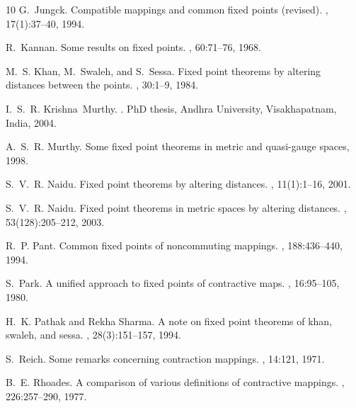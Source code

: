 \documentclass[11]{article}
\numberwithin{equation}{section}
\begin{document}
\begin{thebibliography}{10}
G.~Jungck.
\newblock Compatible mappings and common fixed points (revised).
, 17(1):37--40, 1994.

R.~Kannan.
\newblock Some results on fixed points.
, 60:71--76, 1968.

M.~S. Khan, M.~Swaleh, and S.~Sessa.
\newblock Fixed point theorems by altering distances between the points.
, 30:1--9, 1984.

I.~S.~R. Krishna~Murthy.
.
\newblock PhD thesis, Andhra University, Visakhapatnam, India, 2004.

A.~S.~R. Murthy.
\newblock Some fixed point theorems in metric and quasi-gauge spaces, 1998.

S.~V.~R. Naidu.
\newblock Fixed point theorems by altering distances.
, 11(1):1--16, 2001.

S.~V.~R. Naidu.
\newblock Fixed point theorems in metric spaces by altering distances.
, 53(128):205--212, 2003.

R.~P. Pant.
\newblock Common fixed points of noncommuting mappings.
, 188:436--440, 1994.

S.~Park.
\newblock A unified approach to fixed points of contractive maps.
, 16:95--105, 1980.

H.~K. Pathak and Rekha Sharma.
\newblock A note on fixed point theorems of khan, swaleh, and sessa.
, 28(3):151--157, 1994.

S.~Reich.
\newblock Some remarks concerning contraction mappings.
, 14:121, 1971.

B.~E. Rhoades.
\newblock A comparison of various definitions of contractive mappings.
, 226:257--290, 1977.


\end{thebibliography}
\end{document}

